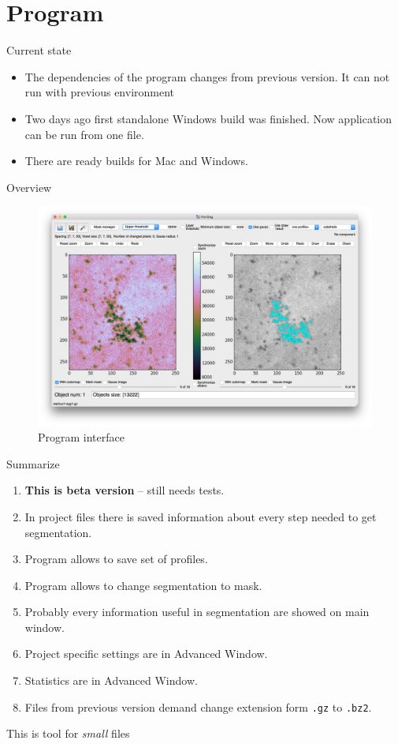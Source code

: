 \documentclass[10pt,usenames,dvipsnames]{beamer}
\begin{document}
\section{Program}
\begin{frame}[c]{Current state}
\begin{itemize}
  \item The dependencies of the program changes from previous version. 
    It can not run with previous environment
  \item Two days ago first standalone Windows build was finished. Now application can be run from one file.
  \item There are ready builds for Mac and Windows. 
\end{itemize}
\end{frame}
\begin{frame}[c]{Overview}
  \begin{figure}[htpb]
    \centering
    \includegraphics[width=1\linewidth]{interface}
    \caption{Program interface}
    \label{fig:name}
  \end{figure}
\end{frame}
\begin{frame}[c]{Summarize}
  \begin{enumerate}
    \item \textbf{This is beta version} – still needs tests.
    \item In project files there is saved information about every step needed to get segmentation. 
    \item Program allows to save set of profiles.
    \item Program allows to change segmentation to mask. 
    \item Probably every information useful in segmentation are showed on main window.
    \item Project specific settings are in Advanced Window.
    \item Statistics are in Advanced Window.
    \item Files from previous version demand change extension form \texttt{.gz} to \texttt{.bz2}.
  \end{enumerate}  
\end{frame}
\begin{frame}[standout]{}
  This is tool for \emph{small} files  
\end{frame}
\end{document}

